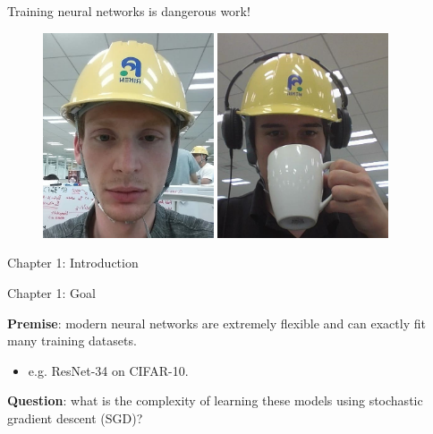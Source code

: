 \documentclass[mathserif,notheorems, hyperref={colorlinks, citecolor=blue, urlcolor=blue, linkcolor=blue}]{beamer}
\begin{document}
    \begin{frame}{Training neural networks is dangerous work!}
       
       \begin{figure}
            \centering
            \includegraphics[width=0.45\textwidth]{collaborators/helmet1} 
            \includegraphics[width=0.45\textwidth]{collaborators/helmet2} 
       \end{figure} 
    \end{frame}
  

    \begin{frame}
       \begin{center}
           \Huge Chapter 1: Introduction
       \end{center} 
    \end{frame}


    \begin{frame}{Chapter 1: Goal}
        \Large 
        
        \textbf{Premise}: modern neural networks are extremely flexible and can exactly fit many training datasets. 
        \begin{itemize}
            \item e.g. ResNet-34 on CIFAR-10. 
        \end{itemize}        

        \vspace{4ex} 

        \textbf{Question}: what is the complexity of learning these models using stochastic gradient descent (SGD)?%
        
    \end{frame}
\end{document}
